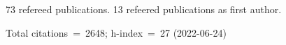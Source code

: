 73 refereed publications. 13 refeered publications as first author.

Total citations~=~2648; h-index~=~27 (2022-06-24)